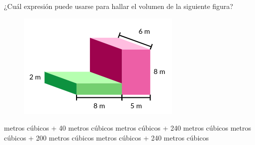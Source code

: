 \question[10] ¿Cuál expresión puede usarse para hallar el volumen de la siguiente figura?

\begin{minipage}{0.45\textwidth}
    \begin{figure}[H]
        \includegraphics[width=0.9\linewidth]{../images/20230316195222}
        \caption{}
        \label{fig:20230316195222}
    \end{figure}
\end{minipage}
\begin{minipage}{0.45\linewidth}
    \begin{choices}
         metros cúbicos + 40 metros cúbicos
         metros cúbicos + 240 metros cúbicos
         metros cúbicos + 200 metros cúbicos
         metros cúbicos + 240 metros cúbicos
    \end{choices}
\end{minipage}
